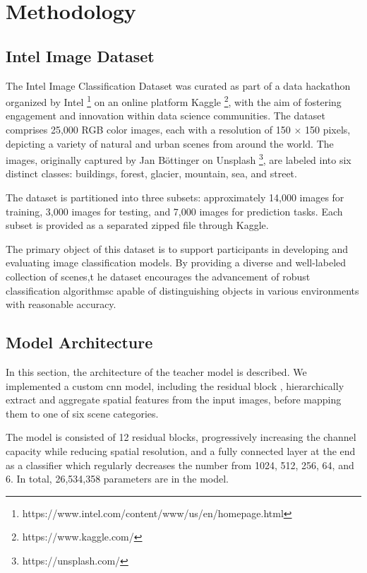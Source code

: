 \section{Methodology}

\subsection{Intel Image Dataset}

The Intel Image Classification Dataset \cite{intel_image_classification_kaggle} was curated
as part of a data hackathon organized
by Intel \footnote{https://www.intel.com/content/www/us/en/homepage.html}
on an online platform Kaggle \footnote{https://www.kaggle.com/},
with the aim of fostering engagement and innovation within data science communities.
The dataset comprises 25,000 RGB color images,
each with a resolution of 150 $\times$ 150 pixels,
depicting a variety of natural and urban scenes from around the world.
The images, originally captured by Jan Böttinger
on Unsplash \footnote{https://unsplash.com/},
are labeled into six distinct classes: buildings, forest, glacier, mountain, sea, and street.

The dataset is partitioned into three subsets: approximately 14,000 images for training,
3,000 images for testing, and 7,000 images for prediction tasks.
Each subset is provided as a separated zipped file through Kaggle.

The primary object of this dataset is to support participants
in developing and evaluating image classification models.
By providing a diverse and well-labeled collection of scenes,t
he dataset encourages the advancement of robust classification algorithmsc
apable of distinguishing objects in various environments with reasonable accuracy.

\subsection{Model Architecture}
\label{sec:method:model_architecture}

In this section, the architecture of the teacher model is described.
We implemented a custom \gls*{cnn} model, including the residual block \cite{he2016deep},
hierarchically extract and aggregate spatial features from the input images,
before mapping them to one of six scene categories.

The model is consisted of 12 residual blocks,
progressively increasing the channel capacity while reducing spatial resolution,
and a fully connected layer at the end as a classifier
which regularly decreases the number from 1024, 512, 256, 64, and 6.
In total, 26,534,358 parameters are in the model.

